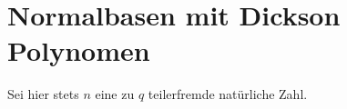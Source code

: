 \chapter{Normalbasen mit Dickson Polynomen}

Sei hier stets $n$ eine zu $q$ teilerfremde natürliche Zahl.


